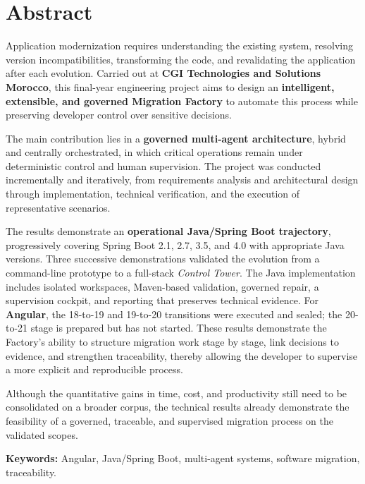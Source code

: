 \chapter*{Abstract}

Application modernization requires understanding the existing system, resolving version incompatibilities, transforming the code, and revalidating the application after each evolution. Carried out at \textbf{CGI Technologies and Solutions Morocco}, this final-year engineering project aims to design an \textbf{intelligent, extensible, and governed Migration Factory} to automate this process while preserving developer control over sensitive decisions.

The main contribution lies in a \textbf{governed multi-agent architecture}, hybrid and centrally orchestrated, in which critical operations remain under deterministic control and human supervision. The project was conducted incrementally and iteratively, from requirements analysis and architectural design through implementation, technical verification, and the execution of representative scenarios.

The results demonstrate an \textbf{operational Java/Spring Boot trajectory}, progressively covering Spring Boot 2.1, 2.7, 3.5, and 4.0 with appropriate Java versions. Three successive demonstrations validated the evolution from a command-line prototype to a full-stack \textit{Control Tower}. The Java implementation includes isolated workspaces, Maven-based validation, governed repair, a supervision cockpit, and reporting that preserves technical evidence. For \textbf{Angular}, the 18-to-19 and 19-to-20 transitions were executed and sealed; the 20-to-21 stage is prepared but has not started. These results demonstrate the Factory's ability to structure migration work stage by stage, link decisions to evidence, and strengthen traceability, thereby allowing the developer to supervise a more explicit and reproducible process.

Although the quantitative gains in time, cost, and productivity still need to be consolidated on a broader corpus, the technical results already demonstrate the feasibility of a governed, traceable, and supervised migration process on the validated scopes.

\vspace{0.4cm}
\noindent\textbf{Keywords:} Angular, Java/Spring Boot, multi-agent systems, software migration, traceability.
